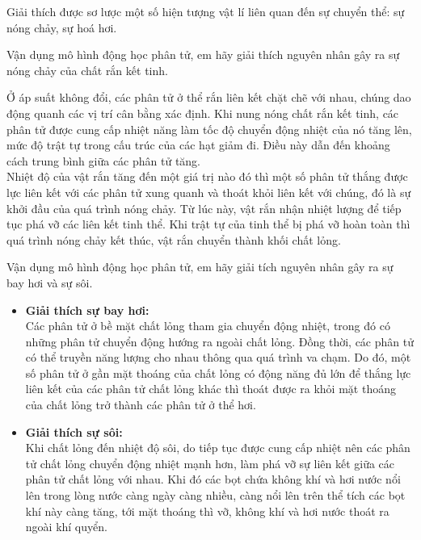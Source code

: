 \begin{dang}{Giải thích được sơ lược một số hiện tượng vật lí liên quan đến sự chuyển thể: sự nóng chảy, sự hoá hơi.}
	{Vận dụng mô hình động học phân tử, em hãy giải thích nguyên nhân gây ra sự nóng chảy của chất rắn kết tinh.
		
	}
	{
		Ở áp suất không đổi, các phân tử ở thể rắn liên kết chặt chẽ với nhau, chúng dao động quanh các vị trí cân bằng xác định. Khi nung nóng chất rắn kết tinh, các phân tử được cung cấp nhiệt năng làm tốc độ chuyển động nhiệt của nó tăng lên, mức độ trật tự trong cấu trúc của các hạt giảm đi.  Điều này dẫn đến khoảng cách trung bình giữa các phân tử tăng.\\
		Nhiệt độ của vật rắn tăng đến một giá trị nào đó thì một số phân tử thắng được lực liên kết với các phân tử xung quanh và thoát khỏi liên kết với chúng, đó là sự khởi đầu của quá trình nóng chảy. Từ lúc này, vật rắn nhận nhiệt lượng để tiếp tục phá vỡ các liên kết tinh thể. Khi trật tự của tinh thể bị phá vỡ hoàn toàn thì quá trình nóng chảy kết thúc, vật rắn chuyển thành khối chất lỏng.
	}
	
	{Vận dụng mô hình động học phân tử, em hãy giải tích nguyên nhân gây ra sự bay hơi và sự sôi.
		
	}
	{\begin{itemize}
			\item \textbf{Giải thích sự bay hơi:}\\
			Các phân tử ở bề mặt chất lỏng tham gia chuyển động nhiệt, trong đó có những phân tử chuyển động hướng ra ngoài chất lỏng. Đồng thời, các phân tử có thể truyền năng lượng cho nhau thông qua quá trình va chạm. Do đó, một số phân tử ở gần mặt thoáng của chất lỏng có động năng đủ lớn để thắng lực liên kết của các phân tử chất lỏng khác thì thoát được ra khỏi mặt thoáng của chất lỏng trở thành các phân tử ở thể hơi.
			\item \textbf{Giải thích sự sôi:}\\
			Khi chất lỏng đến nhiệt độ sôi, do tiếp tục được cung cấp nhiệt nên các phân tử chất lỏng chuyển động nhiệt mạnh hơn, làm phá vỡ sự liên kết giữa các phân tử chất lỏng với nhau. Khi đó các bọt chứa không khí và hơi nước nổi lên trong lòng nước càng ngày càng nhiều, càng nổi lên trên thể tích các bọt khí này càng tăng, tới mặt thoáng thì vỡ, không khí và hơi nước thoát ra ngoài khí quyển.
		\end{itemize}
	}
\end{dang}